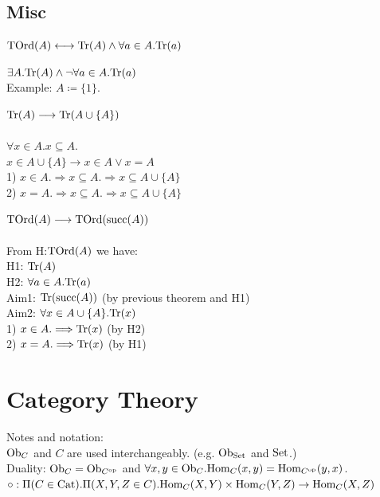 \documentclass[10pt,a4paper]{article}
\begin{document}
\subsection{Misc}
\begin{definition}
${\textrm{TOrd}}(A) \longleftrightarrow {\textrm{Tr}}(A)\land \forall a\in A. {\textrm{Tr}}(a)$
\end{definition}
\begin{theorem}
$\exists A. {\textrm{Tr}}(A) \land \neg \forall a\in A. {\textrm{Tr}}(a)$
\\Example: $A\coloneqq \{1\}$.
\end{theorem}
\begin{theorem}
${\textrm{Tr}}(A) \longrightarrow {\textrm{Tr}}(A\cup\{A\})$
\\\myprf
\\$\forall x\in A.x\subseteq A.$
\\$x\in A\cup\{A\} \longrightarrow x\in A \lor x=A$
\\1) $x\in A. \Longrightarrow x\subseteq A. \Longrightarrow x\subseteq A\cup\{A\}$
\\2) $x = A. \Longrightarrow x\subseteq A. \Longrightarrow x\subseteq A\cup\{A\}$
\\\myqed
\end{theorem}
\begin{theorem}
  $ {\textrm{TOrd}}(A) \longrightarrow {\textrm{TOrd}}({\textrm{succ}}(A))$
\\\myprf
\\From H:${\textrm{TOrd}}(A)$ we have:
\\H1: ${\textrm{Tr}}(A)$
\\H2: $\forall a\in A. {\textrm{Tr}}(a)$
\\Aim1: ${\textrm{Tr}}({\textrm{succ}}(A))$ (by previous theorem and H1)
\\Aim2: $\forall x\in A\cup\{A\}. {\textrm{Tr}}(x)$
\\1) $x\in A. \Longrightarrow {\textrm{Tr}}(x)$ (by H2)
\\2) $x = A. \Longrightarrow {\textrm{Tr}}(x)$ (by H1) %
\\\myqed
\end{theorem}
\section{Category Theory}
Notes and notation:\\
${\textrm{Ob}}_C$ and $C$ are used interchangeably. (e.g. ${\textrm{Ob}}_{\textrm{Set}}$ and ${\textrm{Set}}$.)\\
Duality: ${\textrm{Ob}}_C = {\textrm{Ob}}_{C^{\textrm{op}}}$ and 
 $\forall x,y \in {\textrm{Ob}}_C. {\textrm{Hom}}_C(x,y) = {\textrm{Hom}}_{C^{\textrm{op}}}(y,x)$.\\
$\circ : \Pi(C\in {\textrm{Cat}}).\Pi(X,Y,Z\in C).{\textrm{Hom}}_C(X,Y)\times{\textrm{Hom}}_C(Y,Z)\to{\textrm{Hom}}_C(X,Z)$
\end{document}
